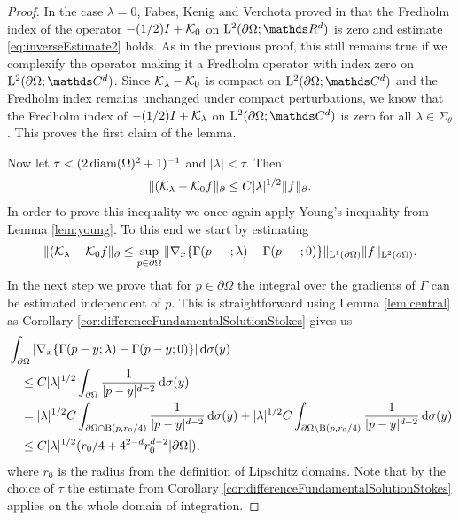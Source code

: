\begin{proof}
  In the case $\lambda = 0$, Fabes, Kenig and Verchota proved in \cite{fabesKenigVerchota} that the Fredholm index of the operator $-(1/2)I + \mathcal{K}_0$ on $\Ell^2(\partial\Omega; \R^d)$ is zero and estimate \eqref{eq:inverseEstimate2} holds.
  As in the previous proof, this still remains true if we complexify the operator making it a Fredholm operator with index zero on  $\Ell^2(\partial\Omega; \C^d)$.
  Since $\mathcal{K}_\lambda - \mathcal{K}_0$ is compact on $\Ell^2(\partial\Omega; \C^d)$ and the Fredholm index remains unchanged under compact perturbations, we know that the Fredholm index of $-(1/2)I + \mathcal{K}_\lambda$ on $\Ell^2(\partial\Omega; \C^d)$ is zero for all $\lambda \in \Sigma_\theta$.
  This proves the first claim of the lemma.

  Now let $\tau < (2 \operatorname{diam}(\Omega)^2 + 1)^{-1}$ and $|\lambda| < \tau$.
  Then
  \begin{align*}
    \| (\mathcal{K}_\lambda - \mathcal{K}_0 f\|_\partial \leq C |\lambda|^{1/2} \|f\|_\partial.
  \end{align*}
  In order to prove this inequality we once again apply Young's inequality from Lemma \ref{lem:young}. To this end we start by estimating
  \begin{align*}
    \| (\mathcal{K}_\lambda - \mathcal{K}_0 f\|_\partial \leq \sup_{p \in \partial\Omega} \| \nabla_x \{ \Gamma(p - \cdot; \lambda) - \Gamma(p - \cdot; 0) \} \|_{\mathrm{L}^1(\partial\Omega)} \| f\|_{\mathrm{L}^2(\partial\Omega)}.
  \end{align*}
  In the next step we prove that for $p \in \partial\Omega$ the integral over the gradients of $\Gamma$ can be estimated independent of $p$.
  This is straightforward using Lemma \ref{lem:central} as Corollary \ref{cor:differenceFundamentalSolutionStokes} gives us
  \begin{align*}
    &\int_{\partial\Omega} | \nabla_x \{ \Gamma(p - y; \lambda) - \Gamma(p - y; 0) \} | \, {\operatorname{d}\!{\sigma}}(y)\\
    &\quad\leq C |\lambda|^{1/2} \int_{\partial\Omega} \frac{1}{|p - y|^{d - 2}} \, {\operatorname{d}\!{\sigma}}(y) \\
    &\quad= |\lambda|^{1/2} C \int_{\partial\Omega \cap \mathrm{B}(p, r_0/4)} \frac{1}{|p - y|^{d - 2}} \, {\operatorname{d}\!{\sigma}}(y) + |\lambda|^{1/2} C \int_{\partial\Omega \setminus \mathrm{B}(p, r_0/4)} \frac{1}{|p - y|^{d - 2}} \, {\operatorname{d}\!{\sigma}}(y) \\
    &\quad\leq C |\lambda|^{1/2} ( r_0/4 + 4^{2 - d} r_0^{d - 2} |\partial\Omega| ),
  \end{align*}
  where $r_0$ is the radius from the definition of Lipschitz domains. 
  Note that by the choice of $\tau$ the estimate from Corollary \ref{cor:differenceFundamentalSolutionStokes} applies on the whole domain of integration.


\end{proof}
